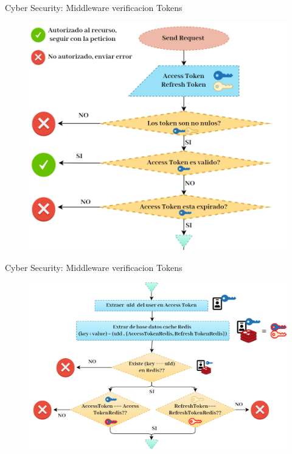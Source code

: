 \documentclass[xcolor=pdftex,dvipsnames,table]{beamer}
\begin{document}
\begin{frame}{Cyber Security: Middleware verificacion Tokens }
        \begin{figure}
            \centering
            \includegraphics[width=0.7\linewidth]{cyber/5diagrama1.PNG}
            \label{fig:my_label}
        \end{figure}
\end{frame}
\begin{frame}{Cyber Security: Middleware verificacion Tokens }
        \begin{figure}
            \centering
            \includegraphics[width=0.9\linewidth]{cyber/5diagrama2.PNG}
            \label{fig:my_label}
        \end{figure}
\end{frame}
\end{document}
